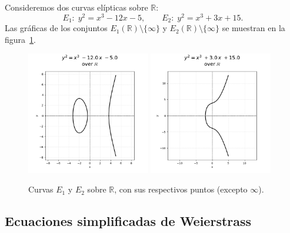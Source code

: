 \begin{ejemplo}
Consideremos dos curvas elípticas sobre \(\mathbb{R}\):
\[
  E_1: \;y^2 = x^3 - 12x - 5,
  \qquad
  E_2: \;y^2 = x^3 + 3x + 15.
\]
Las gráficas de los conjuntos \(E_1(\mathbb{R})\setminus\{\infty\}\) y
\(E_2(\mathbb{R})\setminus\{\infty\}\) se muestran en la figura~\ref{fig:curvas_reales}.
\end{ejemplo}

\begin{figure}[H]
  \centering
  \includegraphics[width=0.48\textwidth]{imagenes/elliptic_curve2D_example.png}
  \hfill
  \includegraphics[width=0.48\textwidth]{imagenes/elliptic_curve2D_example2.png}
  \caption{Curvas \(E_1\) y \(E_2\) sobre \(\mathbb{R}\), con sus respectivos puntos (excepto \(\infty\)).}
  \label{fig:curvas_reales}
\end{figure}

\subsection{Ecuaciones simplificadas de Weierstrass}\label{sec:simplificaciones_weierstrass_curvas_elipticas}

